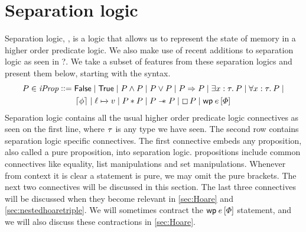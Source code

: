 \documentclass[thesis.tex]{subfiles}
\begin{document}
\section{Separation logic}
\label{sec:seplogic}
Separation logic, \cite*{ishtiaqBIAssertionLanguage2001,reynoldsSeparationLogicLogic2002}, is a logic that allows us to represent the state of memory in a higher order predicate logic. We also make use of recent additions to separation logic as seen in ?. We take a subset of features from these separation logics and present them below, starting with the syntax.
\begin{align*}
  \prop \in \iProp \bnfdef{} & \FALSE \mid \TRUE \mid \prop \land \prop \mid \prop \lor \prop \mid \prop \Ra \prop \mid \Exists \var:\type. \prop \mid \All \var:\type. \prop \mid \\
                             & \pure{\pprop} \mid \loc \fmapsto \val \mid \prop * \prop \mid \prop \wand \prop \mid \always\prop \mid \wpre\expr{\pred}
\end{align*}
Separation logic contains all the usual higher order predicate logic connectives as seen on the first line, where $\tau$ is any type we have seen. The second row contains separation logic specific connectives. The first connective embeds any \coq proposition, also called a pure proposition, into separation logic. \coq propositions include common connectives like equality, list manipulations and set manipulations. Whenever from context it is clear a statement is pure, we may omit the pure brackets. The next two connectives will be discussed in this section. The last three connectives will be discussed when they become relevant in \cref*{sec:Hoare} and \cref*{sec:nestedhoaretriple}. We will sometimes contract the $\wpre\expr{\pred}$ statement, and we will also discuss these contractions in \cref*{sec:Hoare}.
\end{document}
